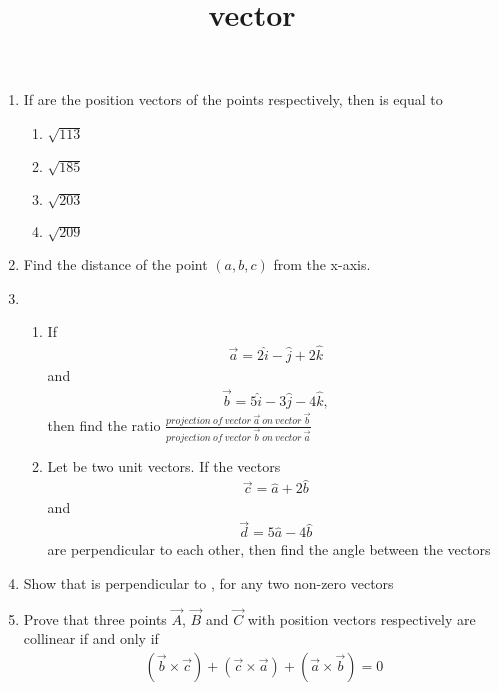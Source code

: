 \documentclass{article}
\title{vector}
\begin{document}
\begin{enumerate}
	\item If  are the position vectors of the points  respectively, then  is equal to
\begin{enumerate}[label=(\Alph*)]
\item $\sqrt{113}$
\item $\sqrt{185}$
\item $\sqrt{203}$
\item $\sqrt{209}$
\end{enumerate}
\item Find the distance of the point $(a, b, c)$ from the x-axis.
\item \begin{enumerate} %
		\item If 
			\begin{align}
				\vec{a}= 2\hat{i} - \hat{j} + 2\hat{k}
			\end{align}
			and
			\begin{align}
				\vec{b} = 5\hat{i} - 3\hat{j} - 4\hat{k},
			\end{align}
			then find the ratio
		$\frac{projection\:of\:vector\:\vec{a}\:on\:vector \:\vec{b}}{projection\:of\:vector\:\vec{b}\:on\:vector\:\vec{a}}$
\item Let  be two unit vectors. If the vectors 
	\begin{align}	
		\vec{c} = \hat{a} + 2\hat{b}
	\end{align}
		and 
		\begin{align}
			\vec{d} = 5\hat{a} - 4\hat{b} 
		\end{align}
		are perpendicular to each other, then find the angle between the vectors  
\end{enumerate}
\item Show that  is perpendicular to , for any two non-zero vectors 
\item Prove that three points $\vec{A}$, $\vec{B}$ and $\vec{C}$ with position vectors  respectively are collinear if and only if 
	\begin{align}
		(\vec{b} \times \vec{c}) + (\vec{c} \times \vec{a}) + (\vec{a} \times \vec{b}) = 0
	\end{align}
\end{enumerate}
\end{document}
